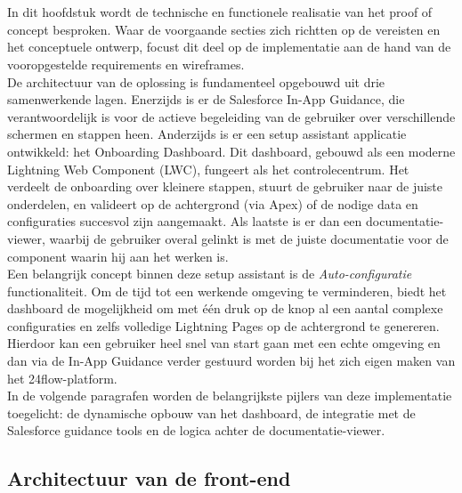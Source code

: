 \chapter{}%
\label{ch:realisatie}

In dit hoofdstuk wordt de technische en functionele realisatie van het proof of concept besproken. Waar de voorgaande secties zich richtten op de vereisten en het conceptuele ontwerp, focust dit deel op de implementatie aan de hand van de vooropgestelde requirements en wireframes. 
\\

De architectuur van de oplossing is fundamenteel opgebouwd uit drie samenwerkende lagen. Enerzijds is er de Salesforce In-App Guidance, die verantwoordelijk is voor de actieve begeleiding van de gebruiker over verschillende schermen en stappen heen. Anderzijds is er een setup assistant applicatie ontwikkeld: het Onboarding Dashboard. Dit dashboard, gebouwd als een moderne Lightning Web Component (LWC), fungeert als het controlecentrum. Het verdeelt de onboarding over kleinere stappen, stuurt de gebruiker naar de juiste onderdelen, en valideert op de achtergrond (via Apex) of de nodige data en configuraties succesvol zijn aangemaakt. Als laatste is er dan een documentatie-viewer, waarbij de gebruiker overal gelinkt is met de juiste documentatie voor de component waarin hij aan het werken is.
\\

Een belangrijk concept binnen deze setup assistant is de \textit{Auto-configuratie} functionaliteit. Om de tijd tot een werkende omgeving te verminderen, biedt het dashboard de mogelijkheid om met één druk op de knop al een aantal complexe configuraties en zelfs volledige Lightning Pages op de achtergrond te genereren. Hierdoor kan een gebruiker heel snel van start gaan met een echte omgeving en dan via de In-App Guidance verder gestuurd worden bij het zich eigen maken van het 24flow-platform.
\\

In de volgende paragrafen worden de belangrijkste pijlers van deze implementatie toegelicht: de dynamische opbouw van het dashboard, de integratie met de Salesforce guidance tools en de logica achter de documentatie-viewer.

\section{Architectuur van de front-end}

